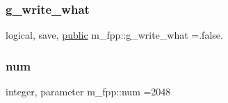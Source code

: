 \mbox{\label{namespacem__fpp_af335701dbc275345d350373c77b5ddc5}} 
\subsubsection{\texorpdfstring{g\+\_\+write\+\_\+what}{g\_write\_what}}
{\footnotesize\ttfamily logical, save, \hyperlink{M__stopwatch_83_8txt_a2f74811300c361e53b430611a7d1769f}{public} m\+\_\+fpp\+::g\+\_\+write\+\_\+what =.false.}

\mbox{\label{namespacem__fpp_adaa4b6694f65973ef728ad2189a8e6f2}} 
\subsubsection{\texorpdfstring{num}{num}}
{\footnotesize\ttfamily integer, parameter m\+\_\+fpp\+::num =2048}

